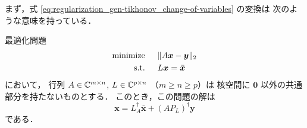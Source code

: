 まず，式 \eqref{eq:regularization_gen-tikhonov_change-of-variables} の変換は
次のような意味を持っている．

\begin{lemma}\label{lemma:regularization_gen-tikhonov_meaning-of-change-of-variables}
    最適化問題
    \begin{align}
        \text{minimize} \hspace{1.5em} & \|A \bm{x} - \bm{y}\|_2 \notag \\
        \text{s.t.} \hspace{1.5em}     & L \bm{x} = \bar{\bm{x}} \notag
    \end{align}
    において，
    行列
    $A \in \mathbb{C}^{m \times n}$,
    $L \in \mathbb{C}^{p \times n}$
    （$m \ge n \ge p$）は
    核空間に $\bm{0}$ 以外の共通部分を持たないものとする．
    このとき，この問題の解は
    \begin{equation}
        \bm{x} = L_A^\dagger \bar{\bm{x}} + (A P_L)^\dagger\bm{y}
    \end{equation}
    である．
\end{lemma}
